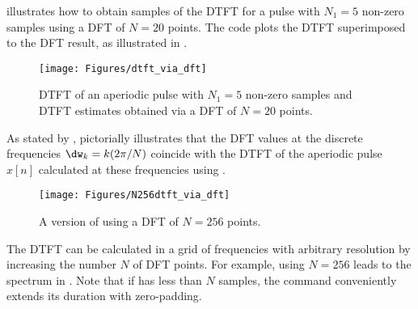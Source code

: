  illustrates how to obtain samples of the DTFT for a pulse with $N_1=5$ non-zero samples using a DFT of $N=20$ points.
The code plots the DTFT superimposed to the DFT result, as illustrated in .

\begin{figure}[!htb]
        \centering
                \texttt{[image: Figures/dtft\_via\_dft]}        
        \caption{DTFT of an aperiodic pulse with $N_1=5$ non-zero samples and DTFT estimates obtained via a DFT of $N=20$ points.\label{fig:dtft_via_dft}}
\end{figure}

As stated by , 
 pictorially illustrates that the DFT values at the discrete frequencies $\dw_k = k (2 \pi / N)$ coincide with 
the DTFT of the aperiodic pulse $x[n]$ calculated at these frequencies using .

\begin{figure}[!htb]
        \centering
                \texttt{[image: Figures/N256dtft\_via\_dft]}            
        \caption{A version of  using a DFT of $N=256$ points.\label{fig:N256dtft_via_dft}}
\end{figure}

The DTFT can be calculated in a grid of frequencies with arbitrary resolution by increasing the number $N$ of DFT points. For example, using $N=256$ leads to the spectrum in .
Note that if  has less than $N$ samples, the command  conveniently extends its duration with zero-padding.
\eApplication

